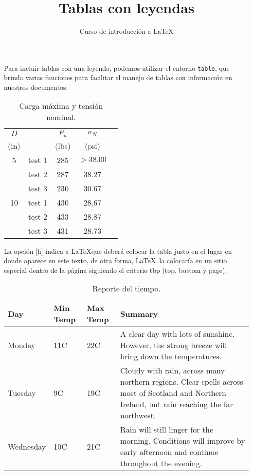 \documentclass[10pt,letterpaper]{article}
\title{Tablas con leyendas}
\author{Curso de introducción a LaTeX}
\begin{document}
\maketitle

Para incluir tablas con una leyenda, podemos utilizar el entorno \texttt{table}, que brinda varias funciones para facilitar el manejo de tablas con información en nuestros documentos.

\begin{table}[h]
%
\caption{Carga máxima y tensión nominal.} %
\centering %
%
\begin{tabular}{clccc}
\toprule
%
$D$ & & $P_u$ & $\sigma_N$ \\
(in)& & (lbs) & (psi) \\
\midrule
%
5 & test 1 & 285 & $ > 38.00$ \\
& test 2 & 287 & 38.27 \\
& test 3 & 230 & 30.67 \\
10 & test 1 & 430 & 28.67 \\
& test 2 & 433 & 28.87 \\
& test 3 & 431 & 28.73 \\
\bottomrule
\end{tabular}
\end{table}

La opción [h] indica a \LaTeX que deberá colocar la tabla justo en el lugar en donde aparece en este texto, de otra forma, \LaTeX\ la colocaría en un sitio especial dentro de la página siguiendo el criterio tbp (top, bottom y page).


\begin{table}[h]
%
\caption{Reporte del tiempo.} %
\centering %
\begin{tabular}{ | l | l | l | p{6cm} |}
\hline
 Day & Min Temp & Max Temp & Summary \\ \hline
 Monday & 11C & 22C & A clear day with lots of sunshine.  
 However, the strong breeze will bring down the temperatures. \\
\hline
 Tuesday & 9C & 19C & Cloudy with rain, across many northern regions. Clear spells
 across most of Scotland and Northern Ireland,
 but rain reaching the far northwest. \\
\hline
 Wednesday & 10C & 21C & Rain will still linger for the morning.
 Conditions will improve by early afternoon and continue
 throughout the evening. \\
\hline
\end{tabular}
\end{table}
\end{document}
